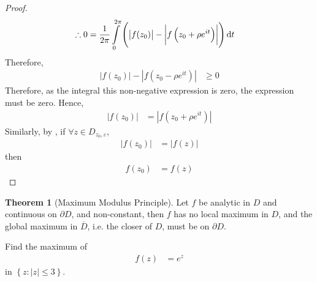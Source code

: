 \documentclass[titlepage, fleqn, a4paper, 12pt, twoside]{article}
\theoremstyle{definition}
\theoremstyle{theorem}
\newtheorem{theorem}{Theorem}
\begin{document}
\begin{proof}
\begin{align*}
		\therefore 0                                                                    & = \frac{1}{2 \pi} \int\limits_{0}^{2 \pi} \left( \left| f(z_0) \right| - \left| f\left( z_0 + \rho e^{i t} \right) \right| \right) \dif t
	\end{align*}
	Therefore,
	\begin{align*}
		\left| f(z_0) \right| - \left| f\left( z_0 - \rho e^{i t} \right) \right| & \ge 0
	\end{align*}
	Therefore, as the integral this non-negative expression is zero, the expression must be zero.
	Hence,
	\begin{align*}
		\left| f(z_0) \right| & = \left| f\left( z_0 + \rho e^{i t} \right) \right|
	\end{align*}
	Similarly, by , if $\forall z \in D_{z_0,\varepsilon}$,
	\begin{align*}
		\left| f(z_0) \right| & = \left| f(z) \right|
	\end{align*}
	then
	\begin{align*}
		f(z_0) & = f(z)
	\end{align*}
\end{proof}

\begin{theorem}[Maximum Modulus Principle]
	Let $f$ be analytic in $D$ and continuous on $\partial D$, and non-constant, then $f$ has no local maximum in $D$, and the global maximum in $\overline{D}$, i.e. the closer of $D$, must be on $\partial D$.
	\label{thm:Maximum_Modulus_Principle}
\end{theorem}

\begin{question}
	Find the maximum of
	\begin{align*}
		f(z) & = e^z
	\end{align*}
	in $\left\{ z : |z| \le 3 \right\}$.
\end{question}
\end{document}
